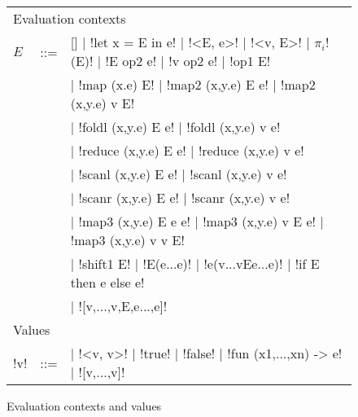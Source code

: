 \begin{figure*}[t]
    \begin{tabular}{|l c l|}
        \hline
        \multicolumn{3}{|l|}{Evaluation contexts} \\
        $E$ & \mbox{::=} & 
        [] 
        $\mid$ !let x = E in e! 
        $\mid$ !<E, e>!
        $\mid$ !<v, E>!
        $\mid$ $\pi_i$!(E)!
        $\mid$ !E op2 e!
        $\mid$ !v op2 e!
        $\mid$ !op1 E! \\
        && $\mid$ !map (x.e) E!
        $\mid$ !map2 (x,y.e) E e!
        $\mid$ !map2 (x,y.e) v E! \\
        && $\mid$ !foldl (x,y.e) E e!
        $\mid$ !foldl (x,y.e) v e! \\
        && $\mid$ !reduce (x,y.e) E e! 
        $\mid$ !reduce (x,y.e) v e! \\
        && $\mid$ !scanl (x,y.e) E e!
        $\mid$ !scanl (x,y.e) v e! \\
        && $\mid$ !scanr (x,y.e) E e!
        $\mid$ !scanr (x,y.e) v e! \\
        && $\mid$ !map3 (x,y.e) E e e!
        $\mid$ !map3 (x,y.e) v E e!
        $\mid$ !map3 (x,y.e) v v E! \\
        && $\mid$ !shift1 E!
        $\mid$ !E(e...e)!
        $\mid$ !e(v...vEe...e)!
        $\mid$ !if E then e else e! \\
        && $\mid$ ![v,...,v,E,e...,e]!
        \\ \hline
        \multicolumn{3}{|l|}{Values} \\ 
        !v! & \mbox{::=} & 
        \cnst{}  
        $\mid$ !<v, v>!
        $\mid$ !true! 
        $\mid$ !false!
        $\mid$ !fun (x1,...,xn) -> e!
        $\mid$ ![v,...,v]! 
        \\ \hline
        \end{tabular}
    \caption{Evaluation contexts and values}
\label{fig:diff_macro}    \end{figure*}